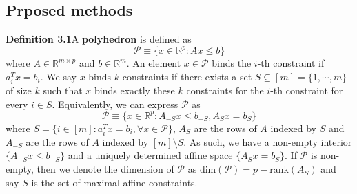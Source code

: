 \documentclass[11pt]{article}
\begin{document}





\subsection{Prposed methods}
\textbf{Definition 3.1}\quad A \textbf{polyhedron} is defined as 
\begin{equation}
    \mathcal{P} \equiv \{x \in \mathbb{R}^p : Ax \leq b \}
\end{equation} 
where $A \in \mathbb{R}^{m \times p}$ and $b \in \mathbb{R}^{m}$. An element $x \in \mathcal{P}$ 
binds the $i$-th constraint if $a_i^T x = b_i$. We say $x$ binds $k$ constraints if there exists 
a set $S \subseteq [m] = \{1, \cdots, m\}$ of size $k$ such that $x$ binds exactly these $k$ 
constraints for the $i$-th constraint for every $i \in S$. Equivalently, we can express $\mathcal{P}$ 
as
\begin{equation}
    \mathcal{P} \equiv \{x \in \mathbb{R}^p : A_{-S}x \leq b_{-S}, A_{S}x = b_{S} \}
\end{equation} 
where $S = \{i \in [m]: a_i^T x = b_i, \forall x \in \mathcal{P}\}$, $A_{S}$ are the rows of $A$ 
indexed by $S$ and $A_{-S}$ are the rows of $A$ indexed by $[m] \setminus S$. As such, we have a 
non-empty interior $\{A_{-S}x \leq b_{-S}\}$ and a uniquely determined affine space 
$\{A_{S}x = b_{S}\}$. If $\mathcal{P}$ is non-empty, then we denote the dimension of $\mathcal{P}$ 
as $\text{dim}(\mathcal{P}) = p - \text{rank}(A_S)$ and say $S$ is the set of maximal affine 
constraints.
\end{document}

